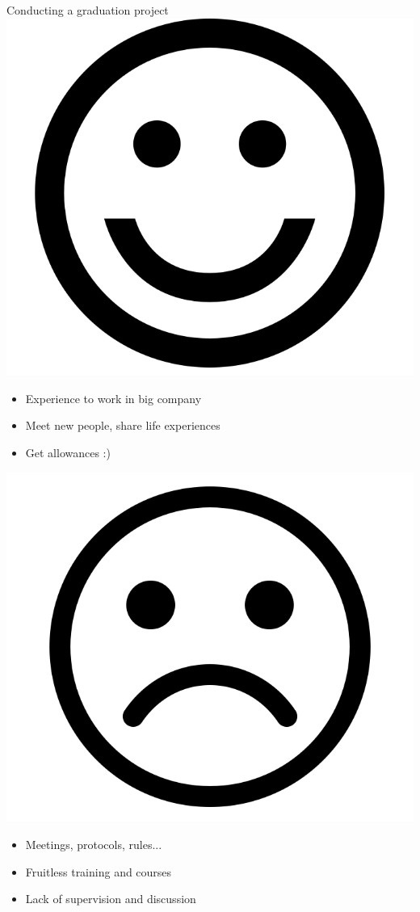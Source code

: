 \documentclass[12pt, aspectratio=43]{beamer}
\begin{document}
\begin{frame}{Conducting a graduation project}
\includegraphics[scale=0.08]{images/Happy.png}
\begin{itemize}
    \item Experience to work in big company
    \item Meet new people, share life experiences
    \item Get allowances :)
\end{itemize}
\includegraphics[scale=0.08]{images/Sad.png}
\begin{itemize}
    \item Meetings, protocols, rules...
    \item Fruitless training and courses
    \item Lack of supervision and discussion
\end{itemize}

\end{frame}
\end{document}
